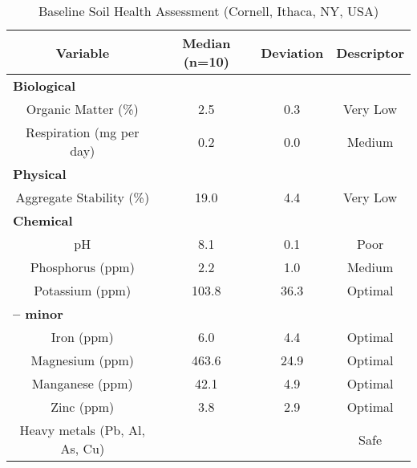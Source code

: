 \documentclass[
]{article}
\begin{document}
\begin{table}

\caption{\label{tab:chem}Baseline Soil Health Assessment (Cornell, Ithaca, NY, USA)}
\centering
\begin{tabular}[t]{c|c|c|c}
\hline
\textbf{Variable} & \textbf{Median (n=10)} & \textbf{Deviation} & \textbf{Descriptor}\\
\hline
\multicolumn{4}{l}{\textbf{Biological}}\\
\hline
\hspace{1em}Organic Matter (\%) & 2.5 & 0.3 & Very Low\\
\hline
\hspace{1em}Respiration (mg per day) & 0.2 & 0.0 & Medium\\
\hline
\multicolumn{4}{l}{\textbf{Physical}}\\
\hline
\hspace{1em}Aggregate Stability (\%) & 19.0 & 4.4 & Very Low\\
\hline
\multicolumn{4}{l}{\textbf{Chemical}}\\
\hline
\hspace{1em}pH & 8.1 & 0.1 & Poor\\
\hline
\hspace{1em}Phosphorus (ppm) & 2.2 & 1.0 & Medium\\
\hline
\hspace{1em}Potassium (ppm) & 103.8 & 36.3 & Optimal\\
\hline
\multicolumn{4}{l}{\textbf{-- minor}}\\
\hline
\hspace{1em}\hspace{1em}Iron (ppm) & 6.0 & 4.4 & Optimal\\
\hline
\hspace{1em}\hspace{1em}Magnesium (ppm) & 463.6 & 24.9 & Optimal\\
\hline
\hspace{1em}\hspace{1em}Manganese (ppm) & 42.1 & 4.9 & Optimal\\
\hline
\hspace{1em}\hspace{1em}Zinc (ppm) & 3.8 & 2.9 & Optimal\\
\hline
\hspace{1em}\hspace{1em}Heavy metals (Pb, Al, As, Cu) &  &  & Safe\\
\hline
\end{tabular}
\end{table}
\end{document}
